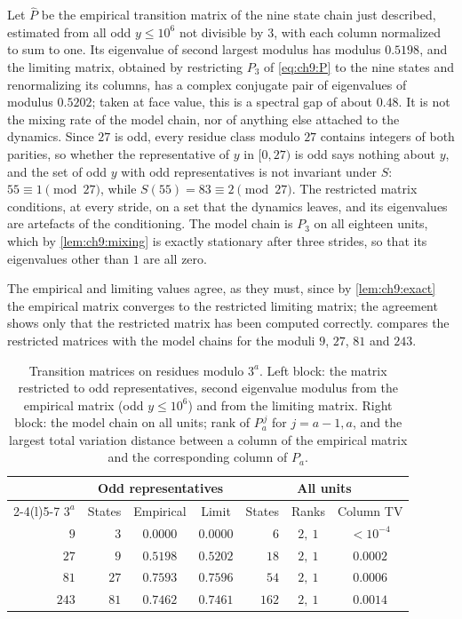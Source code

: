 \begin{remark}\label{rem:ch9:oddreps}
Let $\hat P$ be the empirical transition matrix of the nine state chain just described, estimated from all odd $y\le10^6$ not divisible by $3$, with each column normalized to sum to one. Its eigenvalue of second largest modulus has modulus $0.5198$, and the limiting matrix, obtained by restricting $P_3$ of \eqref{eq:ch9:P} to the nine states and renormalizing its columns, has a complex conjugate pair of eigenvalues of modulus $0.5202$; taken at face value, this is a spectral gap of about $0.48$. It is not the mixing rate of the model chain, nor of anything else attached to the dynamics. Since $27$ is odd, every residue class modulo $27$ contains integers of both parities, so whether the representative of $y$ in $[0,27)$ is odd says nothing about $y$, and the set of odd $y$ with odd representatives is not invariant under $S$: $55\equiv1\pmod{27}$, while $S(55)=83\equiv2\pmod{27}$. The restricted matrix conditions, at every stride, on a set that the dynamics leaves, and its eigenvalues are artefacts of the conditioning. The model chain is $P_3$ on all eighteen units, which by \cref{lem:ch9:mixing} is exactly stationary after three strides, so that its eigenvalues other than $1$ are all zero.
\end{remark}

The empirical and limiting values agree, as they must, since by \cref{lem:ch9:exact} the empirical matrix converges to the restricted limiting matrix; the agreement shows only that the restricted matrix has been computed correctly.  compares the restricted matrices with the model chains for the moduli $9$, $27$, $81$ and $243$.

\begin{table}[t]
\centering
\caption{Transition matrices on residues modulo $3^a$. Left block: the matrix restricted
to odd representatives, second eigenvalue modulus from the empirical matrix
(odd $y\le10^6$) and from the limiting matrix. Right block: the model chain on
all units; rank of $P_a^{\,j}$ for $j=a-1,a$, and the largest total variation
distance between a column of the empirical matrix and the corresponding column
of $P_a$.}
\label{tab:ch9:moduli}
\begin{tabular}{@{}rrccrcc@{}}
\toprule
& \multicolumn{3}{c}{Odd representatives} & \multicolumn{3}{c}{All units}\\
\cmidrule(lr){2-4}\cmidrule(l){5-7}
$3^a$ & States & Empirical & Limit & States & Ranks & Column TV\\
\midrule
$9$ & $3$ & $0.0000$ & $0.0000$ & $6$ & $2,\ 1$ & $<10^{-4}$\\
$27$ & $9$ & $0.5198$ & $0.5202$ & $18$ & $2,\ 1$ & $0.0002$\\
$81$ & $27$ & $0.7593$ & $0.7596$ & $54$ & $2,\ 1$ & $0.0006$\\
$243$ & $81$ & $0.7462$ & $0.7461$ & $162$ & $2,\ 1$ & $0.0014$\\
\bottomrule
\end{tabular}
\end{table}

